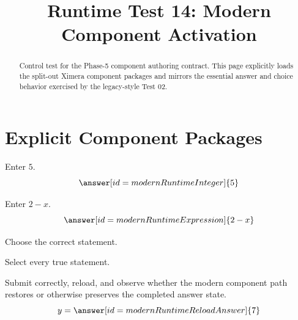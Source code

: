 \documentclass{ximera}
\title{Runtime Test 14: Modern Component Activation}
\begin{document}
\begin{abstract}
Control test for the Phase-5 component authoring contract. This page explicitly
loads the split-out Ximera component packages and mirrors the essential answer
and choice behavior exercised by the legacy-style Test 02.
\end{abstract}
\maketitle

\section{Explicit Component Packages}

\begin{problem}
Enter \(5\).
\[
\answer[id=modernRuntimeInteger]{5}
\]
\end{problem}

\begin{problem}
Enter \(2-x\).
\[
\answer[id=modernRuntimeExpression]{2-x}
\]
\end{problem}

\begin{problem}
Choose the correct statement.
\begin{multipleChoice}
\end{multipleChoice}
\end{problem}

\begin{problem}
Select every true statement.
\begin{selectAll}
\end{selectAll}
\end{problem}

\begin{problem}
Submit correctly, reload, and observe whether the modern component path restores
or otherwise preserves the completed answer state.
\[
y=\answer[id=modernRuntimeReloadAnswer]{7}
\]
\end{problem}
\end{document}

